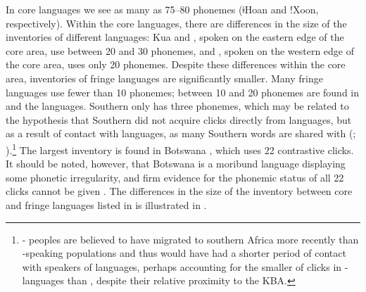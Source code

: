 \documentclass[output=paper,newtxmath,modfonts,nonflat,draftmode]{langsci/langscibook}
\begin{document}
In core languages we see as many as 75–80  phonemes (ǂHoan and !Xoon, respectively). Within the core languages, there are differences in the size of the  inventories of different languages: Kua and , spoken on the eastern edge of the core area, use between 20 and 30  phonemes, and , spoken on the western edge of the core area, uses only 20  phonemes. Despite these differences within the core area,  inventories of fringe languages are significantly smaller. Many fringe languages use fewer than 10  phonemes; between 10 and 20  phonemes are found in  and the  languages. Southern  only has three  phonemes, which may be related to the hypothesis that Southern  did not acquire clicks directly from  languages, but as a result of contact with  languages, as many Southern   words are shared with  (\citealt{bourquin1951}; \citealt[23]{Doke1957}).\footnote{- peoples are believed to have migrated to southern Africa more recently than -speaking populations \citep[31]{Pakendorf2017} and thus would have had a shorter period of contact with speakers of  languages, perhaps accounting for the smaller  of clicks in - languages than , despite their relative proximity to the KBA.} The largest  inventory is found in Botswana , which uses 22 contrastive clicks. It should be noted, however, that Botswana  is a moribund language displaying some phonetic irregularity, and firm evidence for the phonemic status of all 22 clicks cannot be given \citep{Fulop2003}. The differences in the size of the  inventory between core and fringe languages listed in  is illustrated in . 
\end{document}
